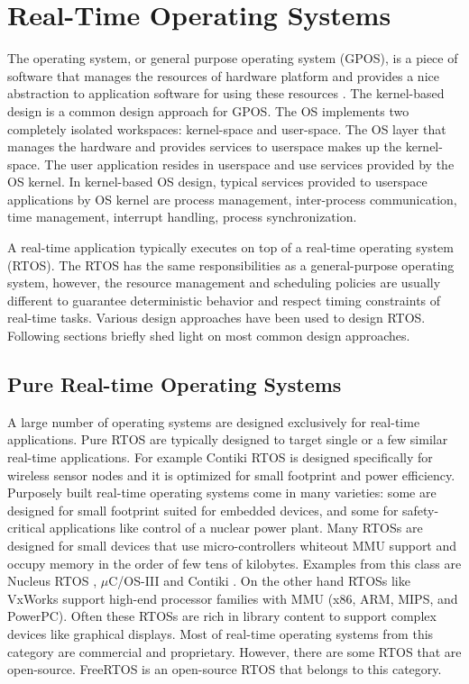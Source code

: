 \section{Real-Time Operating Systems} \label{sec:rtos-and-types}
The operating system, or general purpose operating system (GPOS), is a piece of software that manages the resources of hardware platform and provides a nice abstraction to application software for using these resources \cite{Tanenbaum:2014:MOS:2655363}. The kernel-based design is a common design approach for GPOS. The OS implements two completely isolated workspaces: kernel-space and user-space. The OS layer that manages the hardware and provides services to userspace makes up the kernel-space.
The user application resides in userspace and use services provided by the OS kernel. In kernel-based OS design, typical services provided to userspace applications by OS kernel are process management, inter-process communication, time management, interrupt handling, process synchronization. 

A real-time application typically executes on top of a real-time operating system (RTOS). 
The RTOS has the same responsibilities as a general-purpose operating system, 
however, the resource management and scheduling policies are usually different to guarantee deterministic behavior and respect timing constraints of real-time tasks.
Various design approaches have been used to design RTOS.
Following sections briefly shed light on most common design approaches.

\subsection{Pure Real-time Operating Systems}
A large number of operating systems are designed exclusively for real-time applications.
Pure RTOS are typically designed to target single or a few similar real-time applications. 
For example Contiki RTOS \cite{Dunkels:2004:CLF:1032658.1034117} is designed specifically for wireless sensor nodes and it is optimized for small footprint and power efficiency.
Purposely built real-time operating systems come in many varieties: some are designed for small footprint suited for embedded devices, and some for safety-critical applications like control of a nuclear power plant.
Many RTOSs are designed for small devices that use micro-controllers whiteout MMU support and occupy memory in the order of few tens of kilobytes.
Examples from this class are Nucleus RTOS \cite{nucleus_rtos}, $\mu$C/OS-III \cite{micrium-rtos} and Contiki \cite{contiki-online}.
On the other hand RTOSs like VxWorks \cite{vxworks-rtos} support high-end processor families with MMU (x86, ARM, MIPS, and PowerPC). 
Often these RTOSs are rich in library content to support complex devices like graphical displays.
Most of real-time operating systems from this category are commercial and proprietary. 
However, there are some RTOS that are open-source.
FreeRTOS \cite{freertos} is an open-source RTOS that belongs to this category.

